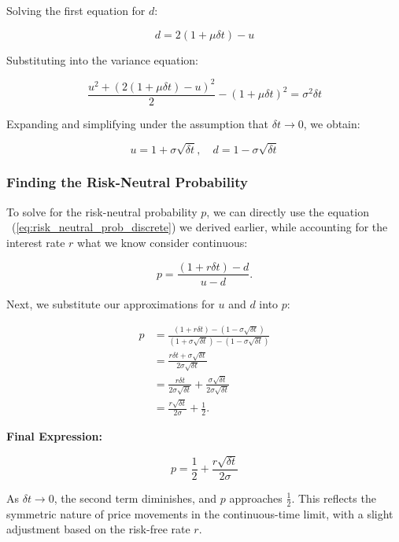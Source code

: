 \documentclass{article}
\begin{document}
Solving the first equation for \( d \):

\[
    d = 2(1 + \mu \delta t) - u
\]

Substituting into the variance equation:

\[
    \frac{u^2 + (2(1 + \mu \delta t) - u)^2}{2} - (1 + \mu \delta t)^2 = \sigma^2 \delta t
\]

Expanding and simplifying under the assumption that \( \delta t \to 0 \), we obtain:

\[
    u = 1 + \sigma \sqrt{\delta t}, \quad d = 1 - \sigma \sqrt{\delta t}
\]

\subsubsection{Finding the Risk-Neutral Probability}

To solve for the risk-neutral probability \( p \), we can directly use the equation ~(\ref{eq:risk_neutral_prob_discrete}) we derived earlier, while accounting for the interest rate \( r \) what we know consider continuous:

\begin{equation}
    \label{eq:risk_neutral_prob_continuous}
    p = \frac{(1 + r \delta t) - d}{u - d}.
\end{equation}

Next, we substitute our approximations for \( u \) and \( d \) into \( p \):

\begin{align*}
    p &= \frac{(1 + r \delta t) - (1 - \sigma \sqrt{\delta t})}{(1 + \sigma \sqrt{\delta t}) - (1 - \sigma \sqrt{\delta t})} \\
    &= \frac{r \delta t + \sigma \sqrt{\delta t}}{2 \sigma \sqrt{\delta t}} \\
    &= \frac{r \delta t}{2 \sigma \sqrt{\delta t}} + \frac{\sigma \sqrt{\delta t}}{2 \sigma \sqrt{\delta t}} \\
    &= \frac{r \sqrt{\delta t}}{2 \sigma} + \frac{1}{2}.
\end{align*}

\bigskip

\noindent
\textbf{Final Expression:}

\begin{equation}
    \label{eq:solved_risk_neutral_prob_continuous}
    \boxed{p = \frac{1}{2} + \frac{r \sqrt{\delta t}}{2 \sigma}}
\end{equation}
    

As \( \delta t \to 0 \), the second term diminishes, and \( p \) approaches \( \frac{1}{2} \). This reflects the symmetric nature of price movements in the continuous-time limit, with a slight adjustment based on the risk-free rate \( r \).
\end{document}
